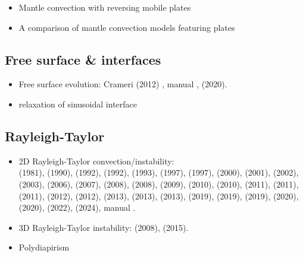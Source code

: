 \begin{itemize}
\item Mantle convection with reversing mobile plates \cite{kogk05}

\item A comparison of mantle convection models featuring plates \cite{stlh14}

\end{itemize}

\subsection{Free surface \& interfaces}

\begin{itemize}

\item Free surface evolution: Crameri \etal (2012) \cite{crsg12}, 
      \aspect{} manual \cite{aspectmanual}, \textcite{sctc20} (2020).

\item relaxation of sinusoidal interface \cite{crsg12,robh17}

\end{itemize}


\subsection{Rayleigh-Taylor}

\begin{itemize}
\item 2D Rayleigh-Taylor convection/instability:\\ 
      \textcite{pros81} (1981),
      \textcite{trab90} (1990),
      \textcite{wesc92} (1992),
      \textcite{popo92} (1992),
      \textcite{ogaw93} (1993),
      \textcite{como97} (1997),
      \textcite{vaks97} (1997),
      \textcite{devv00a} (2000),
      \textcite{soga01} (2001),
      \textcite{bast02} (2002),
      \textcite{taki03} (2003),
      \textcite{bomh06} (2006),
      \textcite{dadh07} (2007),
      \textcite{basd08} (2008),
      \textcite{deka08} (2008),
      \textcite{qurj09} (2009),
      \textcite{saev10} (2010),
      \textcite{sunh10} (2010),
      \textcite{lezh11} (2011),
      \textcite{thie11} (2011),
      \textcite{mishin11} (2011), 
      \textcite{lomw12} (2012), 
      \textcite{maie12} (2012),
      \textcite{fusc13} (2013), 
      \textcite{vyrc13} (2013), 
      \textcite{chtl13} (2013),
      \textcite{ropu19} (2019),
      \textcite{robe19} (2019), 
      \textcite{demh19} (2019),
      \textcite{logb20} (2020),
      \textcite{sctc20} (2020),
      \textcite{mivg22} (2022),
      \textcite{buoa24} (2024),
      \aspect manual \cite{aspectmanual}.

\item 3D Rayleigh-Taylor instability:
      \textcite{fukk08} (2008),
      \textcite{vosc15} (2015).

\item Polydiapirism \cite{wesc92,aspectmanual}

\end{itemize}


